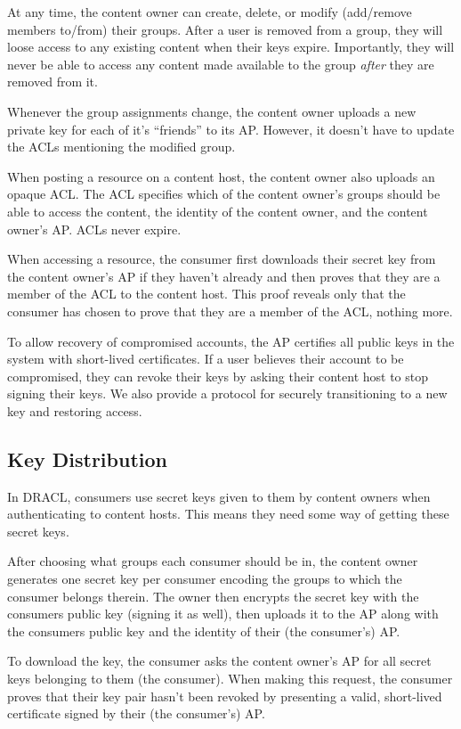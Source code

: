 \documentclass[pdftex,12pt,a4papaer]{report}
\begin{document}
At any time, the content owner can create, delete, or modify (add/remove members
to/from) their groups. After a user is removed from a group, they will loose
access to any existing content when their keys expire. Importantly, they will
never be able to access any content made available to the group \emph{after}
they are removed from it.
  
Whenever the group assignments change, the content owner uploads a new private
key for each of it's ``friends'' to its AP. However, it doesn't have to update
the ACLs mentioning the modified group.
  
When posting a resource on a content host, the content owner also uploads an
opaque ACL. The ACL specifies which of the content owner's groups should be able
to access the content, the identity of the content owner, and the content
owner's AP. ACLs never expire.
  
When accessing a resource, the consumer first downloads their secret key from
the content owner's AP if they haven't already and then proves that they are a
member of the ACL to the content host. This proof reveals only that the consumer
has chosen to prove that they are a member of the ACL, nothing more.
  
To allow recovery of compromised accounts, the AP certifies all public keys in
the system with short-lived certificates. If a user believes their account to be
compromised, they can revoke their keys by asking their content host to stop
signing their keys. We also provide a protocol for securely transitioning to a
new key and restoring access.

\subsection{Key Distribution}

In DRACL, consumers use secret keys given to them by content owners when
authenticating to content hosts. This means they need some way of getting these
secret keys.

After choosing what groups each consumer should be in, the content owner
generates one secret key per consumer encoding the groups to which the consumer
belongs therein. The owner then encrypts the secret key with the consumers
public key (signing it as well), then uploads it to the AP along with the
consumers public key and the identity of their (the consumer's) AP.

To download the key, the consumer asks the content owner's AP for all secret
keys belonging to them (the consumer). When making this request, the consumer
proves that their key pair hasn't been revoked by presenting a valid,
short-lived certificate signed by their (the consumer's) AP.
\end{document}
